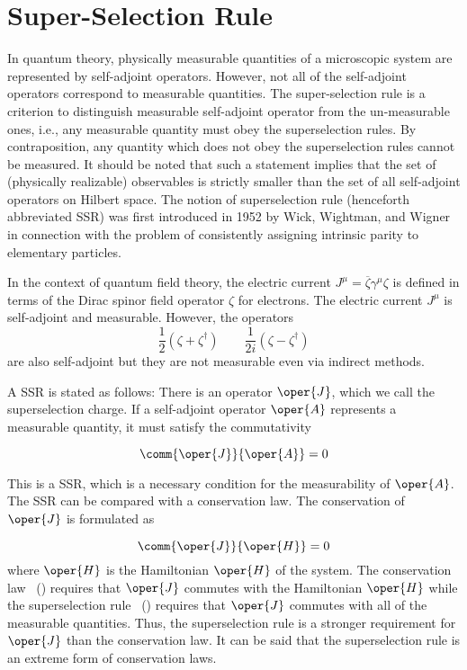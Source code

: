 \chapter{Super-Selection Rule\label{appen:superselection}}


In quantum theory, physically measurable quantities of a microscopic system are represented by self-adjoint operators. However, not all of the self-adjoint operators correspond to measurable quantities. The super-selection rule is a criterion to distinguish measurable self-adjoint operator from the un-measurable ones, i.e., any measurable quantity must obey the superselection rules. By contraposition, any quantity which does not obey the superselection rules cannot be measured. It should be noted that
such a statement implies that the set of (physically realizable) observables is strictly
smaller than the set of all self-adjoint operators on Hilbert space. The notion of superselection rule (henceforth abbreviated SSR) was first introduced
in 1952 by Wick, Wightman, and Wigner~\cite{Wick:1952nb} in connection with the problem of consistently assigning intrinsic parity to elementary particles.


In the context of quantum field theory, the electric current \( J^\mu  = \overline{\zeta}\gamma^\mu \zeta\) is defined in terms of the Dirac spinor field operator \(\zeta\) for electrons. The electric current $J^\mu$ is self-adjoint and measurable. However, the operators
\begin{equation}
	\frac{1}{2}\left(\zeta + \zeta^\dagger \right) \qquad \frac{1}{2i}\left(\zeta - \zeta^\dagger \right)
\end{equation}
are also self-adjoint but they are not measurable even via indirect methods.




A SSR is stated as follows: There is an operator $\oper{J}$, which we call the
superselection charge. If a self-adjoint operator $\oper{A}$ represents a measurable quantity, it must
satisfy the commutativity~\cite{TanimuraSuperSelection}

\begin{equation}
	\label{eq:superselection_law}
	\comm{\oper{J}}{\oper{A}} = 0
\end{equation}

This is a SSR, which is a necessary condition for the measurability of $\oper{A}$.
The SSR can be compared with a conservation law. The conservation of
$\oper{J}$ is formulated as

\begin{equation}
	\label{eq:conservation_law}
	\comm{\oper{J}}{\oper{H}} = 0
\end{equation}
where $\oper{H}$ is the Hamiltonian $\oper{H}$ of the system. The conservation law ~() requires that
$\oper{J}$ commutes with the Hamiltonian $\oper{H}$ while the superselection rule ~() requires that $\oper{J}$ commutes with all of the measurable quantities. Thus, the superselection rule is a stronger requirement for $\oper{J}$ than the conservation law. It can be said that the superselection rule is an extreme form of conservation laws.

